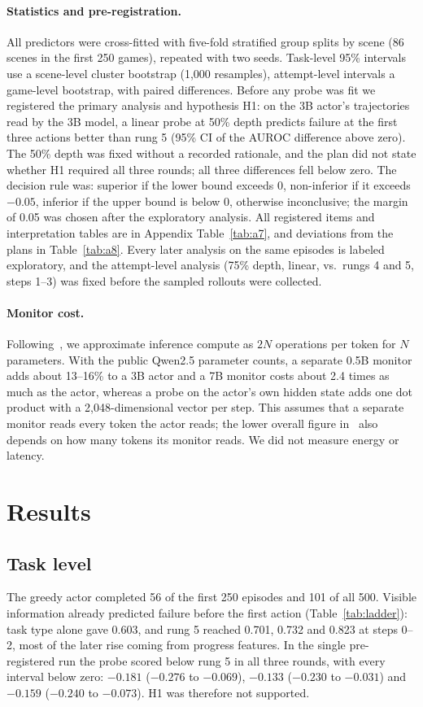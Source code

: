 \documentclass[10pt]{article}
\begin{document}
\paragraph{Statistics and pre-registration.}\label{sec:stats} All predictors were cross-fitted with five-fold stratified group splits by scene (86 scenes in the first 250 games), repeated with two seeds. Task-level 95\% intervals use a scene-level cluster bootstrap (1,000 resamples), attempt-level intervals a game-level bootstrap, with paired differences.
Before any probe was fit we registered the primary analysis and hypothesis H1: on the 3B actor's trajectories read by the 3B model, a linear probe at 50\% depth predicts failure at the first three actions better than rung 5 (95\% CI of the AUROC difference above zero). The 50\% depth was fixed without a recorded rationale, and the plan did not state whether H1 required all three rounds; all three differences fell below zero.
The decision rule was: superior if the lower bound exceeds 0, non-inferior if it exceeds $-0.05$, inferior if the upper bound is below 0, otherwise inconclusive; the margin of 0.05 was chosen after the exploratory analysis. All registered items and interpretation tables are in Appendix Table~\ref{tab:a7}, and deviations from the plans in Table~\ref{tab:a8}.
Every later analysis on the same episodes is labeled exploratory, and the attempt-level analysis (75\% depth, linear, vs.\ rungs 4 and 5, steps 1--3) was fixed before the sampled rollouts were collected.

\paragraph{Monitor cost.} Following~\cite{wang2026failfast}, we approximate inference compute as $2N$ operations per token for $N$ parameters. With the public Qwen2.5 parameter counts, a separate 0.5B monitor adds about 13--16\% to a 3B actor and a 7B monitor costs about 2.4 times as much as the actor, whereas a probe on the actor's own hidden state adds one dot product with a 2,048-dimensional vector per step. This assumes that a separate monitor reads every token the actor reads; the lower overall figure in~\cite{wang2026failfast} also depends on how many tokens its monitor reads. We did not measure energy or latency.

\section{Results}
\subsection{Task level}\label{sec:task}
The greedy actor completed 56 of the first 250 episodes and 101 of all 500. Visible information already predicted failure before the first action (Table~\ref{tab:ladder}): task type alone gave 0.603, and rung 5 reached 0.701, 0.732 and 0.823 at steps 0--2, most of the later rise coming from progress features.
In the single pre-registered run the probe scored below rung 5 in all three rounds, with every interval below zero: $-0.181$ ($-0.276$ to $-0.069$), $-0.133$ ($-0.230$ to $-0.031$) and $-0.159$ ($-0.240$ to $-0.073$). H1 was therefore not supported.
\end{document}
